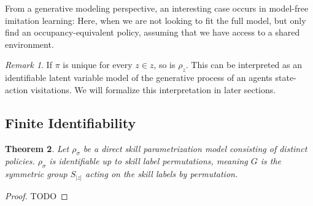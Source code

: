 \documentclass{article}
\theoremstyle{plain}
\newtheorem{theorem}{Theorem}[section]
\theoremstyle{definition}
\theoremstyle{remark}
\newtheorem{remark}[theorem]{Remark}
\begin{document}
From a generative modeling perspective, an interesting case occurs in model-free imitation learning: Here, when we are not looking to fit the full model, but only find an occupancy-equivalent policy, assuming that we have access to a shared environment.

\begin{remark}
    If $\pi$ is unique for every $z\in z$, so is $\rho_z$.
    This can be interpreted as an identifiable latent variable model of the generative process of an agents state-action visitations. We will formalize this interpretation in later sections.
\end{remark}

\subsection{Finite Identifiability}

\begin{theorem}
    Let $\rho_\sigma$ be a direct skill parametrization model consisting of distinct policies. $\rho_\sigma$ is identifiable up to skill label permutations, meaning $G$ is the symmetric group $S_{|z|}$ acting on the skill labels by permutation.
\end{theorem}

\begin{proof}
    TODO
\end{proof}
\end{document}
